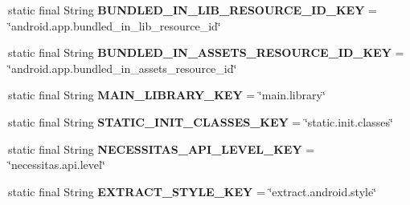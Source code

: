 \begin{DoxyCompactItemize}
\item 
\mbox{\label{classorg_1_1qtproject_1_1qt5_1_1android_1_1bindings_1_1_qt_loader_abe68eba77cfcbc67740ab2aebd1d1c8f}} 
static final String {\bfseries B\+U\+N\+D\+L\+E\+D\+\_\+\+I\+N\+\_\+\+L\+I\+B\+\_\+\+R\+E\+S\+O\+U\+R\+C\+E\+\_\+\+I\+D\+\_\+\+K\+EY} = \char`\"{}android.\+app.\+bundled\+\_\+in\+\_\+lib\+\_\+resource\+\_\+id\char`\"{}
\item 
\mbox{\label{classorg_1_1qtproject_1_1qt5_1_1android_1_1bindings_1_1_qt_loader_a6118469c64766bcbdffdd1ae5f4c99cc}} 
static final String {\bfseries B\+U\+N\+D\+L\+E\+D\+\_\+\+I\+N\+\_\+\+A\+S\+S\+E\+T\+S\+\_\+\+R\+E\+S\+O\+U\+R\+C\+E\+\_\+\+I\+D\+\_\+\+K\+EY} = \char`\"{}android.\+app.\+bundled\+\_\+in\+\_\+assets\+\_\+resource\+\_\+id\char`\"{}
\item 
\mbox{\label{classorg_1_1qtproject_1_1qt5_1_1android_1_1bindings_1_1_qt_loader_a3bb22249df013c3397a0f4dc889d60e1}} 
static final String {\bfseries M\+A\+I\+N\+\_\+\+L\+I\+B\+R\+A\+R\+Y\+\_\+\+K\+EY} = \char`\"{}main.\+library\char`\"{}
\item 
\mbox{\label{classorg_1_1qtproject_1_1qt5_1_1android_1_1bindings_1_1_qt_loader_a79ce01051078441bda6e99de33ccf3a5}} 
static final String {\bfseries S\+T\+A\+T\+I\+C\+\_\+\+I\+N\+I\+T\+\_\+\+C\+L\+A\+S\+S\+E\+S\+\_\+\+K\+EY} = \char`\"{}static.\+init.\+classes\char`\"{}
\item 
\mbox{\label{classorg_1_1qtproject_1_1qt5_1_1android_1_1bindings_1_1_qt_loader_ada924261cc5ac0195558b4fa9e9efb09}} 
static final String {\bfseries N\+E\+C\+E\+S\+S\+I\+T\+A\+S\+\_\+\+A\+P\+I\+\_\+\+L\+E\+V\+E\+L\+\_\+\+K\+EY} = \char`\"{}necessitas.\+api.\+level\char`\"{}
\item 
\mbox{\label{classorg_1_1qtproject_1_1qt5_1_1android_1_1bindings_1_1_qt_loader_aec3f999b143ef64d5ef6a418c4ede6ca}} 
static final String {\bfseries E\+X\+T\+R\+A\+C\+T\+\_\+\+S\+T\+Y\+L\+E\+\_\+\+K\+EY} = \char`\"{}extract.\+android.\+style\char`\"{}

\end{DoxyCompactItemize}
